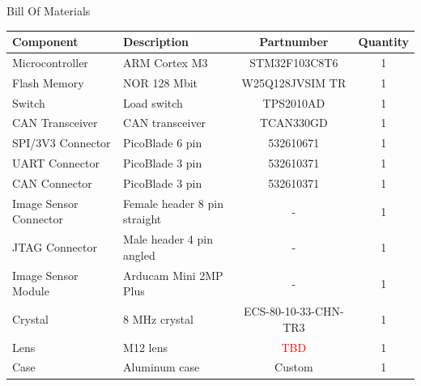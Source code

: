 \begin{frame}{Bill Of Materials}

    \begin{table}[!htb]\tiny
        \centering
        \label{tab:bom}
        \begin{tabular}{lL{2.5cm}cc}
            \toprule[1.5pt]
            \textbf{Component} & \textbf{Description} & \textbf{Partnumber} & \textbf{Quantity} \\
            \midrule
            Microcontroller        & ARM Cortex M3                & STM32F103C8T6        & 1 \\
            Flash Memory           & NOR 128 Mbit                 & W25Q128JVSIM TR      & 1 \\
            Switch                 & Load switch                  & TPS2010AD            & 1 \\
            CAN Transceiver        & CAN transceiver              & TCAN330GD            & 1 \\
            SPI/3V3 Connector      & PicoBlade 6 pin              & 532610671            & 1 \\
            UART Connector         & PicoBlade 3 pin              & 532610371            & 1 \\
            CAN Connector          & PicoBlade 3 pin              & 532610371            & 1 \\
            Image Sensor Connector & Female header 8 pin straight & -                    & 1 \\
            JTAG Connector         & Male header 4 pin angled     & -                    & 1 \\
            Image Sensor Module    & Arducam Mini 2MP Plus        & -                    & 1 \\
            Crystal                & 8 MHz crystal                & ECS-80-10-33-CHN-TR3 & 1 \\
            Lens                   & M12 lens                     & \textcolor{red}{TBD} & 1 \\
            Case                   & Aluminum case                & Custom               & 1 \\
            \bottomrule[1.5pt]
        \end{tabular}
    \end{table}

\end{frame}


